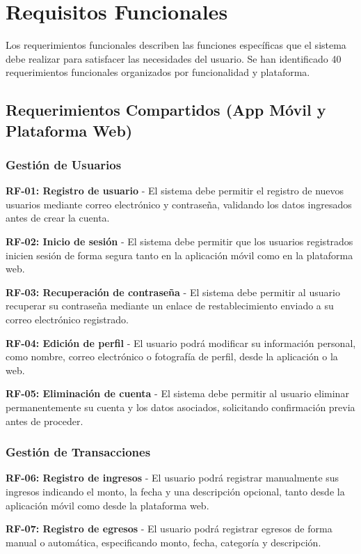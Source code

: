 \section{Requisitos Funcionales}

Los requerimientos funcionales describen las funciones específicas que el sistema debe realizar para satisfacer las necesidades del usuario. Se han identificado 40 requerimientos funcionales organizados por funcionalidad y plataforma.

\subsection{Requerimientos Compartidos (App Móvil y Plataforma Web)}

\subsubsection{Gestión de Usuarios}
\textbf{RF-01: Registro de usuario} - El sistema debe permitir el registro de nuevos usuarios mediante correo electrónico y contraseña, validando los datos ingresados antes de crear la cuenta.

\textbf{RF-02: Inicio de sesión} - El sistema debe permitir que los usuarios registrados inicien sesión de forma segura tanto en la aplicación móvil como en la plataforma web.

\textbf{RF-03: Recuperación de contraseña} - El sistema debe permitir al usuario recuperar su contraseña mediante un enlace de restablecimiento enviado a su correo electrónico registrado.

\textbf{RF-04: Edición de perfil} - El usuario podrá modificar su información personal, como nombre, correo electrónico o fotografía de perfil, desde la aplicación o la web.

\textbf{RF-05: Eliminación de cuenta} - El sistema debe permitir al usuario eliminar permanentemente su cuenta y los datos asociados, solicitando confirmación previa antes de proceder.

\subsubsection{Gestión de Transacciones}
\textbf{RF-06: Registro de ingresos} - El usuario podrá registrar manualmente sus ingresos indicando el monto, la fecha y una descripción opcional, tanto desde la aplicación móvil como desde la plataforma web.

\textbf{RF-07: Registro de egresos} - El usuario podrá registrar egresos de forma manual o automática, especificando monto, fecha, categoría y descripción.

